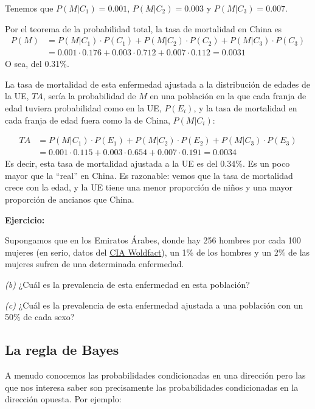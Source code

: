 \documentclass[
  spanish,
  letterpaper,
  DIV=11,
  numbers=noendperiod]{scrreprt}
\begin{document}
\begin{tcolorbox}
Tenemos que \(P(M|C_1)=0.001\), \(P(M|C_2)=0.003\) y \(P(M|C_3)=0.007\).

Por el teorema de la probabilidad total, la tasa de mortalidad en China
es \[
\begin{array}{rl}
P(M)\!\!\!\! &=P(M|C_1)\cdot P(C_1)+P(M|C_2)\cdot P(C_2)+P(M|C_3)\cdot P(C_3)\\
& =0.001\cdot 0.176+0.003\cdot 0.712+0.007\cdot 0.112=0.0031
\end{array}
\] O sea, del 0.31\%.

La tasa de mortalidad de esta enfermedad ajustada a la distribución de
edades de la UE, \(\mathit{TA}\), sería la probabilidad de \(M\) en una
población en la que cada franja de edad tuviera probabilidad como en la
UE, \(P(E_i)\), y la tasa de mortalidad en cada franja de edad fuera
como la de China, \(P(M|C_i)\):

\[
\begin{array}{rl}
\mathit{TA}\!\!\!\!  & =P(M|C_1)\cdot P(E_1)+P(M|C_2)\cdot P(E_2)+P(M|C_3)\cdot P(E_3)\\
& =0.001\cdot 0.115+0.003\cdot 0.654+0.007\cdot 0.191=0.0034
\end{array}
\] Es decir, esta tasa de mortalidad ajustada a la UE es del 0.34\%. Es
un poco mayor que la ``real'' en China. Es razonable: vemos que la tasa
de mortalidad crece con la edad, y la UE tiene una menor proporción de
niños y una mayor proporción de ancianos que China.

\textbf{Ejercicio:}

Supongamos que en los Emiratos Árabes, donde hay 256 hombres por cada
100 mujeres (en serio, datos del
\href{https://www.cia.gov/library/publications/the-world-factbook/geos/print_ae.html}{CIA
Woldfact}), un 1\% de los hombres y un 2\% de las mujeres sufren de una
determinada enfermedad.

\emph{(b)} ¿Cuál es la prevalencia de esta enfermedad en esta población?

\emph{(c)} ¿Cuál es la prevalencia de esta enfermedad ajustada a una
población con un 50\% de cada sexo?

\subsection{La regla de Bayes}\label{la-regla-de-bayes}

A menudo conocemos las probabilidades condicionadas en una dirección
pero las que nos interesa saber son precisamente las probabilidades
condicionadas en la dirección opuesta. Por ejemplo:


\end{tcolorbox}
\end{document}
